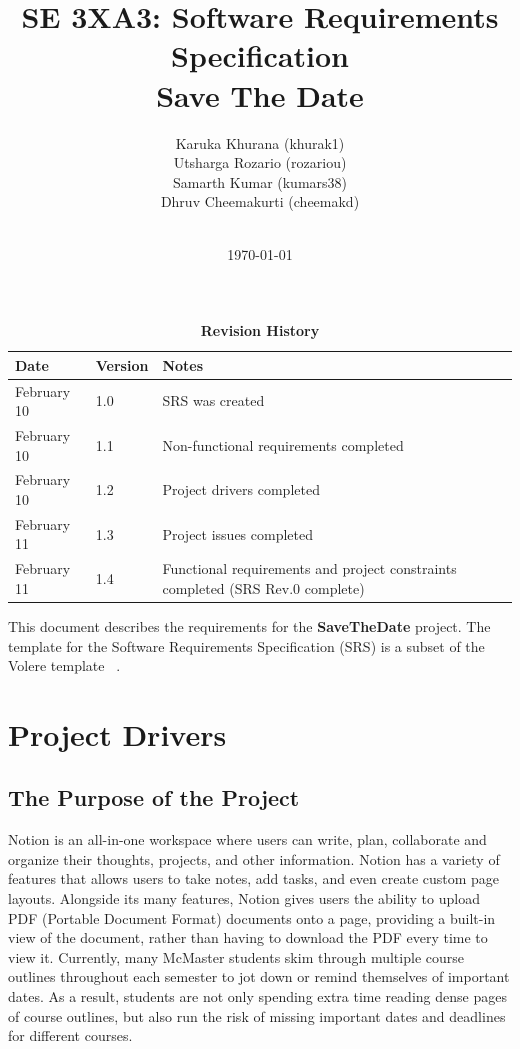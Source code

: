 \documentclass[12pt, titlepage]{article}
\title{SE 3XA3: Software Requirements Specification\\Save The Date}
\author{
        Karuka Khurana (khurak1)\\
        Utsharga Rozario (rozariou)\\
        Samarth Kumar (kumars38)\\
        Dhruv Cheemakurti (cheemakd)\\
        \\
}
\date{\today}
\begin{document}
\maketitle

\tableofcontents
\listoftables
\listoffigures

\begin{table}[bp]
\caption{\bf Revision History}
\begin{tabularx}{\textwidth}{p{3cm}p{2cm}X}
\toprule {\bf Date} & {\bf Version} & {\bf Notes}\\
\midrule
February 10 & 1.0 & SRS was created\\
February 10 & 1.1 & Non-functional requirements completed\\
February 10 & 1.2 & Project drivers completed\\
February 11 & 1.3 & Project issues completed\\
February 11 & 1.4 & Functional requirements and project constraints completed (SRS Rev.0 complete)\\
\bottomrule
\end{tabularx}
\end{table}

\newpage


This document describes the requirements for the \textbf{SaveTheDate} project. 
The template for the Software Requirements Specification (SRS) is a subset of the Volere
template ~\citep{RobertsonAndRobertson2012}.

\section{Project Drivers}

\subsection{The Purpose of the Project}
Notion is an all-in-one workspace where users can write, plan, collaborate and organize their thoughts, projects, and other information. Notion has a variety of features that allows users to take notes, add tasks, and even create custom page layouts. Alongside its many features, Notion gives users the ability to upload PDF (Portable Document Format) documents onto a page, providing a built-in view of the document, rather than having to download the PDF every time to view it. Currently, many McMaster students skim through multiple course outlines throughout each semester to jot down or remind themselves of important dates. As a result, students are not only spending extra time reading dense pages of course outlines, but also run the risk of missing important dates and deadlines for different courses.  
\end{document}
